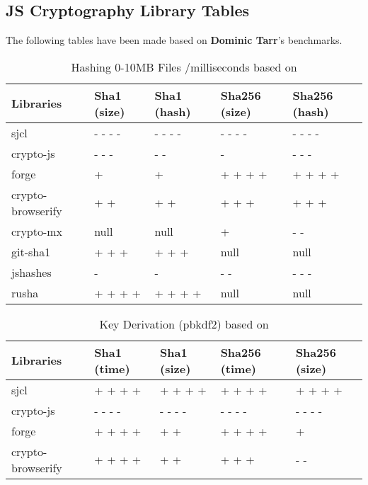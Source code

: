 
\subsection{JS Cryptography Library Tables}
The following tables have been made based on \textbf{Dominic Tarr}'s\cite {Tarr2014PerformanceLibraries.} benchmarks.

\begin{table}[!ht]
\centering
\caption{Hashing 0-10MB Files /milliseconds based on \cite {Tarr2014PerformanceLibraries.}}
\label{tab:hashing-0-10mb-files}
\begin{adjustbox}{center, width=\columnwidth-20pt}
\begin{tabular}{|l|l|l|l|l|}
\hline
Libraries & Sha1 (size) & Sha1 (hash) & Sha256 (size) & Sha256 (hash)	\\ \hline
sjcl				& - - -	-	& - - - -	& - - - -	& - - -	-	\\ \hline
crypto-js			& - - -		& - -		& -			& - - -		\\ \hline
forge				& +			& +			& + + +	+	& + + + +	\\ \hline
crypto-browserify	& + +		& + +		& + + +		& +	+ +		\\ \hline
crypto-mx           & null		& null		& +			& -	-		\\ \hline
git-sha1            & + + +		& + + +		& null		& null		\\ \hline
jshashes            & -			& -			& - -		& - - -		\\ \hline
rusha               & + + + +	& + + + +	& null		& null		\\ \hline
\end{tabular}
\end{adjustbox}
\end{table}

\begin{table}[!ht]
\centering
\caption{Key Derivation (pbkdf2) based on \cite {Tarr2014PerformanceLibraries.}}
\label{tab:key-derivation-pbkdf2}
\begin{adjustbox}{center, width=\columnwidth-20pt}
\begin{tabular}{|l|l|l|l|l|}
\hline
Libraries & Sha1 (time) & Sha1 (size) & Sha256 (time) & Sha256 (size)	\\ \hline
sjcl				& + + + +	& + + + +	& + + + + 	& + + + +		\\ \hline
crypto-js			& - - - -	& - - - -	& - - - -	& - - - -		\\ \hline
forge				& + + + +	& + +		& + + + +	& +				\\ \hline
crypto-browserify	& + + + +	& + +		& + + +		& - -			\\ \hline
\end{tabular}
\end{adjustbox}
\end{table}


